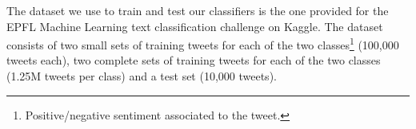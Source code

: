 The dataset we use to train and test our classifiers is the one provided for the EPFL Machine Learning text classification challenge on Kaggle\cite{KaggleEPFL}.
The dataset consists of two small sets of training tweets for each of the two classes\footnote{Positive/negative sentiment associated to the tweet.} (100,000 tweets each), two complete sets of training tweets for each of the two classes (1.25M tweets per class) and a test set (10,000 tweets).